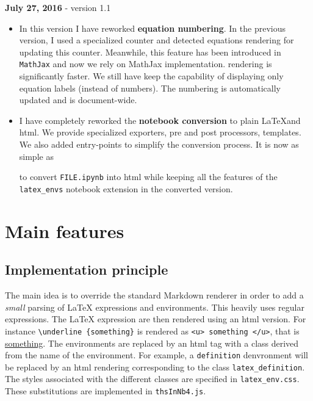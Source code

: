 \textbf{July 27, 2016} - version 1.1

\begin{itemize}
\item
  In this version I have reworked \textbf{equation numbering}. In the
  previous version, I used a specialized counter and detected equations
  rendering for updating this counter. Meanwhile, this feature has been
  introduced in \texttt{MathJax} and now we rely on MathJax
  implementation. rendering is significantly faster. We still have keep
  the capability of displaying only equation labels (instead of
  numbers). The numbering is automatically updated and is document-wide.
\item
  I have completely reworked the \textbf{notebook conversion} to plain
  \LaTeX and html. We provide specialized exporters, pre and post
  processors, templates. We also added entry-points to simplify the
  conversion process. It is now as simple as

\begin{Shaded}
\begin{Highlighting}[]
 
\end{Highlighting}
\end{Shaded}

  to convert \texttt{FILE.ipynb} into html while keeping all the
  features of the \texttt{latex\_envs} notebook extension in the
  converted version.
\end{itemize}

    \section{Main features}\label{main-features}

\subsection{Implementation principle}\label{implementation-principle}

The main idea is to override the standard Markdown renderer in order to
add a \emph{small} parsing of LaTeX expressions and environments. This
heavily uses regular expressions. The LaTeX expression are then rendered
using an html version. For instance
\texttt{\textbackslash{}underline\ \{something\}} is rendered as
\texttt{\textless{}u\textgreater{}\ something\ \textless{}/u\textgreater{}},
that is \underline{something}. The environments are replaced by an html
tag with a class derived from the name of the environment. For example,
a \texttt{definition} denvronment will be replaced by an html rendering
corresponding to the class \texttt{latex\_definition}. The styles
associated with the different classes are specified in
\texttt{latex\_env.css}. These substitutions are implemented in
\texttt{thsInNb4.js}.

